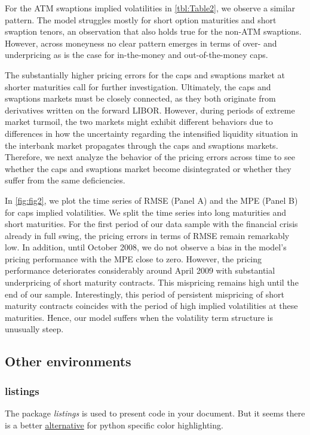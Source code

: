 \documentclass[11pt,a4paper,english,oneside]{book}
\begin{document}


For the ATM swaptions implied volatilities in \cref{tbl:Table2}, we observe a similar pattern. The model struggles mostly for short option maturities and short swaption tenors, an observation that also holds true for the non-ATM swaptions. However, across moneyness no clear pattern emerges in terms of over- and underpricing as is the case for in-the-money and out-of-the-money caps.




The substantially higher pricing errors for the caps and swaptions market at shorter maturities call for further investigation. Ultimately, the caps and swaptions markets must be closely connected, as they both originate from derivatives written on the forward LIBOR. However, during periods of extreme market turmoil, the two markets might exhibit different behaviors due to differences in how the uncertainty regarding the intensified liquidity situation in the interbank market propagates through the caps and swaptions markets. Therefore, we next analyze the behavior of the pricing errors across time to see whether the caps and swaptions market become disintegrated or whether they suffer from the same deficiencies.

In \cref{fig:fig2}, we plot the time series of RMSE (Panel A) and the MPE (Panel B) for caps implied volatilities. We split the time series into long maturities and short maturities. For the first period of our data sample with the financial crisis already in full swing, the pricing errors in terms of RMSE remain remarkably low. In addition, until October 2008, we do not observe a bias in the model's pricing performance with the MPE close to zero. However, the pricing performance deteriorates considerably around April 2009 with substantial underpricing of short maturity contracts. This mispricing remains high until the end of our sample. Interestingly, this period of persistent mispricing of short maturity contracts coincides with the period of high implied volatilities at these maturities. Hence, our model suffers when the volatility term structure is unusually steep.



\subsection{Other environments}
\subsubsection{listings}
The package \emph{listings} is used to present code in your document. But it seems there is a better \href{https://github.com/olivierverdier/python-latex-highlighting}{alternative} for python specific color highlighting.
\end{document}
